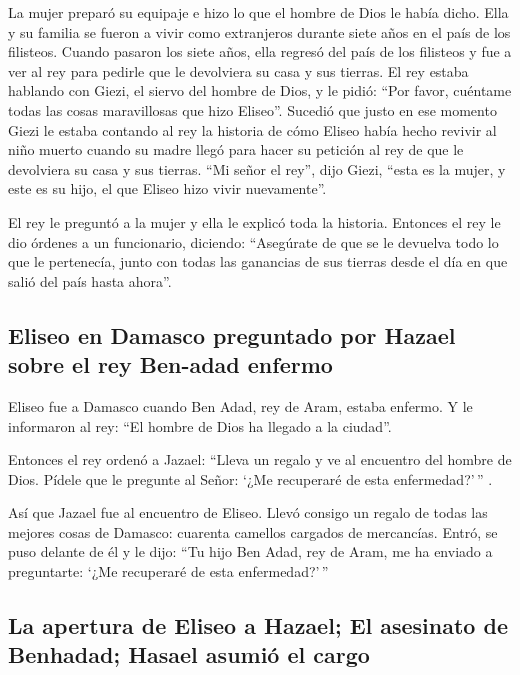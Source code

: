  La mujer preparó su equipaje e hizo lo que el hombre de
Dios le había dicho. Ella y su familia se fueron a vivir como
extranjeros durante siete años en el país de los filisteos.
 Cuando pasaron los siete años, ella regresó del país de
los filisteos y fue a ver al rey para pedirle que le devolviera su casa
y sus tierras.  El rey estaba hablando con Giezi, el
siervo del hombre de Dios, y le pidió: ``Por favor, cuéntame todas las
cosas maravillosas que hizo Eliseo''.  Sucedió que justo
en ese momento Giezi le estaba contando al rey la historia de cómo
Eliseo había hecho revivir al niño muerto cuando su madre llegó para
hacer su petición al rey de que le devolviera su casa y sus tierras.
``Mi señor el rey'', dijo Giezi, ``esta es la mujer, y este es su hijo,
el que Eliseo hizo vivir nuevamente''.

 El rey le preguntó a la mujer y ella le explicó toda la
historia. Entonces el rey le dio órdenes a un funcionario, diciendo:
``Asegúrate de que se le devuelva todo lo que le pertenecía, junto con
todas las ganancias de sus tierras desde el día en que salió del país
hasta ahora''.

\hypertarget{eliseo-en-damasco-preguntado-por-hazael-sobre-el-rey-ben-adad-enfermo}{%
\subsection{Eliseo en Damasco preguntado por Hazael sobre el rey
Ben-adad
enfermo}\label{eliseo-en-damasco-preguntado-por-hazael-sobre-el-rey-ben-adad-enfermo}}

 Eliseo fue a Damasco cuando Ben Adad, rey de Aram, estaba
enfermo. Y le informaron al rey: ``El hombre de Dios ha llegado a la
ciudad''.

 Entonces el rey ordenó a Jazael: ``Lleva un regalo y ve
al encuentro del hombre de Dios. Pídele que le pregunte al Señor: `¿Me
recuperaré de esta enfermedad?'\,'' .

 Así que Jazael fue al encuentro de Eliseo. Llevó consigo
un regalo de todas las mejores cosas de Damasco: cuarenta camellos
cargados de mercancías. Entró, se puso delante de él y le dijo: ``Tu
hijo Ben Adad, rey de Aram, me ha enviado a preguntarte: `¿Me recuperaré
de esta enfermedad?'\,''

\hypertarget{la-apertura-de-eliseo-a-hazael-el-asesinato-de-benhadad-hasael-asumiuxf3-el-cargo}{%
\subsection{La apertura de Eliseo a Hazael; El asesinato de Benhadad;
Hasael asumió el
cargo}\label{la-apertura-de-eliseo-a-hazael-el-asesinato-de-benhadad-hasael-asumiuxf3-el-cargo}}

